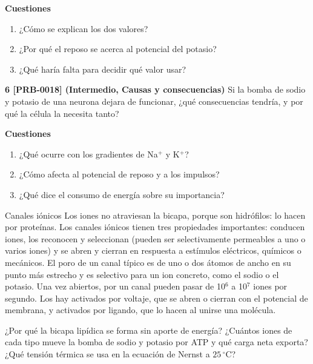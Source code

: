 \documentclass{book}
\begin{document}
\begin{tcolorbox}[title={Ejercicios}, studiumworked, breakable]
\noindent\textbf{Cuestiones}
\begin{enumerate}
\item ¿Cómo se explican los dos valores?
\item ¿Por qué el reposo se acerca al potencial del potasio?
\item ¿Qué haría falta para decidir qué valor usar?
\end{enumerate}

\noindent\textbf{6 [PRB-0018] (Intermedio, Causas y consecuencias)}
Si la bomba de sodio y potasio de una neurona dejara de funcionar, ¿qué consecuencias tendría, y por qué la célula la necesita tanto?


\noindent\textbf{Cuestiones}
\begin{enumerate}
\item ¿Qué ocurre con los gradientes de Na\({}^{+}\) y K\({}^{+}\)?
\item ¿Cómo afecta al potencial de reposo y a los impulsos?
\item ¿Qué dice el consumo de energía sobre su importancia?
\end{enumerate}
\end{tcolorbox}

\begin{tcolorbox}[title={Autoficha}, studiumcheck, breakable]

Canales iónicos
Los iones no atraviesan la bicapa, porque son hidrófilos: lo hacen por proteínas. Los canales iónicos tienen tres propiedades importantes: conducen iones, los reconocen y seleccionan (pueden ser selectivamente permeables a uno o varios iones) y se abren y cierran en respuesta a estímulos eléctricos, químicos o mecánicos. El poro de un canal típico es de uno o dos átomos de ancho en su punto más estrecho y es selectivo para un ion concreto, como el sodio o el potasio. Una vez abiertos, por un canal pueden pasar de 10\({}^{6}\) a 10\({}^{7}\) iones por segundo. Los hay activados por voltaje, que se abren o cierran con el potencial de membrana, y activados por ligando, que lo hacen al unirse una molécula.


¿Por qué la bicapa lipídica se forma sin aporte de energía? ¿Cuántos iones de cada tipo mueve la bomba de sodio y potasio por ATP y qué carga neta exporta? ¿Qué tensión térmica se usa en la ecuación de Nernst a \(25\,{}^{\circ}\mathrm{C}\)?

\end{tcolorbox}
\end{document}
